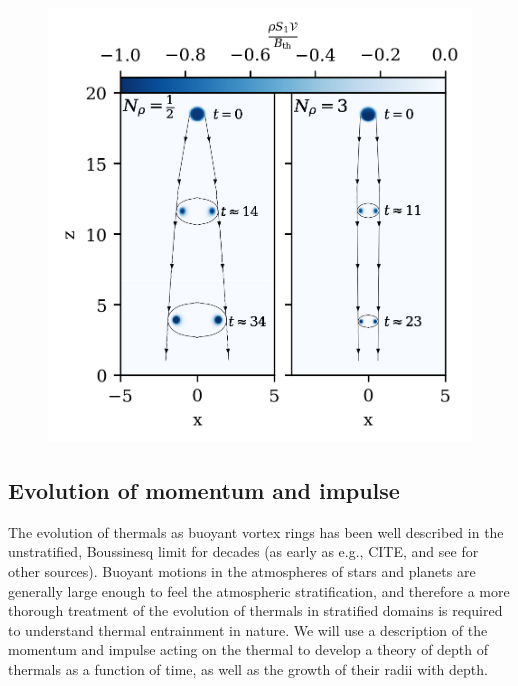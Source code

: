 \documentclass[twocolumn, amsmath, amsfonts, amssymb, trackchanges]{aastex62}
\begin{document}
\begin{figure}[t!]
    \includegraphics[width=\columnwidth]{evolution_colormeshes.png}
    \caption{
    \label{fig:evolution_colormeshes} }
\end{figure}


\subsection{Evolution of momentum and impulse}
The evolution of thermals as buoyant vortex rings has been well described in
the unstratified, Boussinesq limit for decades (as early as e.g., CITE, and
see \citet{lecoanet&jeevanjee2018} for other sources). Buoyant motions 
in the atmospheres of stars and planets are generally large enough to feel the
atmospheric stratification, and therefore a more thorough treatment of the
evolution of thermals in stratified domains is required to understand 
thermal entrainment in nature. We will use a description of the momentum and
impulse acting on the thermal to develop a theory of depth of thermals as a function
of time, as well as the growth of their radii with depth.
\end{document}
